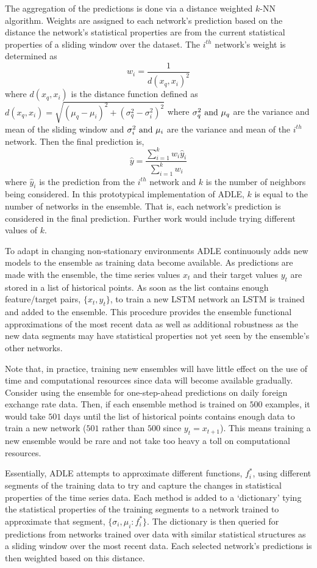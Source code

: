 \documentclass{article}
\begin{document}
The aggregation of the predictions is done via a distance weighted $k$-NN algorithm. Weights are assigned to each network's prediction based on the distance the network's statistical properties are from the current statistical properties of a sliding window over the dataset. The $i^{th}$ network's weight is determined as
$$
	w_i = \frac{1}{d(x_q, x_i)^2}
$$
where $d(x_q, x_i)$ is the distance function defined as $d(x_q, x_i) = \sqrt{(\mu_q - \mu_i)^2 + (\sigma^2_q - \sigma^2_i)^2}$ where $\sigma^2_q \textnormal{ and } \mu_q$ are the variance and mean of the sliding window and $\sigma^2_i \textnormal{ and } \mu_i$ are the variance and mean of the $i^{th}$ network. Then the final prediction is, 
$$
	\hat{y} = \frac{\sum_{i=1}^k w_i\hat{y}_i}{\sum_{i=1}^k w_i}
$$
where $\hat{y}_i$ is the prediction from the $i^{th}$ network and $k$ is the number of neighbors being considered. In this prototypical implementation of ADLE, $k$ is equal to the number of networks in the ensemble. That is, each network's prediction is considered in the final prediction. Further work would include trying different values of $k$.

To adapt in changing non-stationary environments ADLE continuously adds new models to the ensemble as training data become available. As predictions are made with the ensemble, the time series values $x_t$ and their target values $y_t$ are stored in a list of historical points. As soon as the list contains enough feature/target pairs, $\{x_t, y_t\}$, to train a new LSTM network  an LSTM is trained and added to the ensemble. This procedure provides the ensemble functional approximations of the most recent data as well as additional robustness as the new data segments may have statistical properties not yet seen by the ensemble's other networks. 

Note that, in practice, training new ensembles will have little effect on the use of time and computational resources since data will become available gradually. Consider using the ensemble for one-step-ahead predictions on daily foreign exchange rate data. Then, if each ensemble method is trained on $500$ examples, it would take $501$ days until the list of historical points contains enough data to train a new network ($501$ rather than $500$ since $y_t = x_{t+1}$). This means training a new ensemble would be rare and not take too heavy a toll on computational resources.

Essentially, ADLE attempts to approximate different functions, $f^*_i$, using different segments of the training data to try and capture the changes in statistical properties of the time series data. Each method is added to a `dictionary' tying the statistical properties of the training segments to a network trained to approximate that segment, $\{\sigma_i, \mu_i : f^*_i\}$. The dictionary is then queried for predictions from networks trained over data with similar statistical structures as a sliding window over the most recent data. Each selected network's predictions is then weighted based on this distance.
\end{document}
